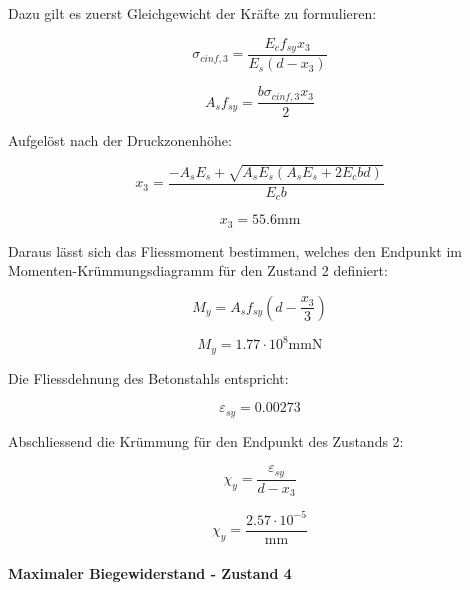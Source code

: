 \documentclass[
  12pt,
  letterpaper,
  egregdoesnotlikesansseriftitles]{scrreprt}
\let\oldparagraph\paragraph
\renewcommand{\paragraph}[1]{\oldparagraph{#1}\mbox{}}
\begin{document}
Dazu gilt es zuerst Gleichgewicht der Kräfte zu formulieren:

\begin{equation}\sigma_{c inf,3} = \frac{E_{c} f_{sy} x_{3}}{E_{s} \left(d - x_{3}\right)}\end{equation}

\begin{equation}A_{s} f_{sy} = \frac{b \sigma_{c inf,3} x_{3}}{2}\end{equation}

Aufgelöst nach der Druckzonenhöhe:

\begin{equation}x_{3} = \frac{- A_{s} E_{s} + \sqrt{A_{s} E_{s} \left(A_{s} E_{s} + 2 E_{c} b d\right)}}{E_{c} b}\end{equation}

\begin{equation}x_{3} = 55.6 \text{mm}\end{equation}

Daraus lässt sich das Fliessmoment bestimmen, welches den Endpunkt im
Momenten-Krümmungsdiagramm für den Zustand 2 definiert:

\begin{equation}M_{y} = A_{s} f_{sy} \left(d - \frac{x_{3}}{3}\right)\end{equation}

\begin{equation}M_{y} = 1.77 \cdot 10^{8} \text{mm} \text{N}\end{equation}

Die Fliessdehnung des Betonstahls entspricht:

\begin{equation}\varepsilon_{sy} = 0.00273\end{equation}

Abschliessend die Krümmung für den Endpunkt des Zustands 2:

\begin{equation}\chi_{y} = \frac{\varepsilon_{sy}}{d - x_{3}}\end{equation}

\begin{equation}\chi_{y} = \frac{2.57 \cdot 10^{-5}}{\text{mm}}\end{equation}

\hypertarget{maximaler-biegewiderstand---zustand-4}{%
\paragraph{Maximaler Biegewiderstand - Zustand
4}\label{maximaler-biegewiderstand---zustand-4}}
\end{document}
